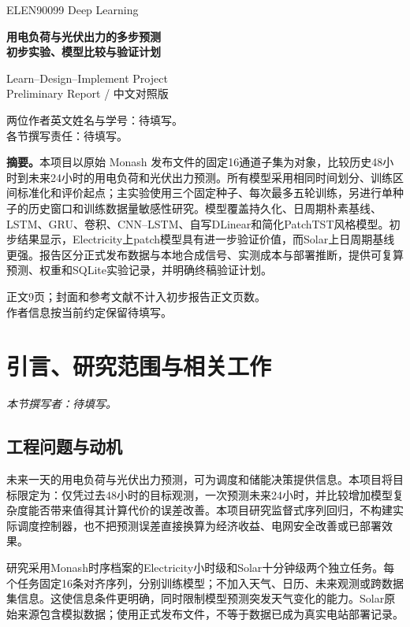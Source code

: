 \documentclass[10pt,a4paper]{article}
\begin{document}
\begin{titlepage}\thispagestyle{empty}\centering\vspace*{22mm}
{\Large ELEN90099 Deep Learning\par}\vspace{8mm}
{\LARGE\bfseries 用电负荷与光伏出力的多步预测\\[4mm]初步实验、模型比较与验证计划\par}\vspace{10mm}
{\large Learn--Design--Implement Project\\Preliminary Report / 中文对照版\par}\vspace{12mm}
两位作者英文姓名与学号：待填写。\\[3mm]各节撰写责任：待填写。
\vspace{12mm}\begin{minipage}{0.88\textwidth}
\textbf{摘要。}本项目以原始 Monash 发布文件的固定16通道子集为对象，比较历史48小时到未来24小时的用电负荷和光伏出力预测。所有模型采用相同时间划分、训练区间标准化和评价起点；主实验使用三个固定种子、每次最多五轮训练，另进行单种子的历史窗口和训练数据量敏感性研究。模型覆盖持久化、日周期朴素基线、LSTM、GRU、卷积、CNN–LSTM、自写DLinear和简化PatchTST风格模型。初步结果显示，Electricity上patch模型具有进一步验证价值，而Solar上日周期基线更强。报告区分正式发布数据与本地合成信号、实测成本与部署推断，提供可复算预测、权重和SQLite实验记录，并明确终稿验证计划。
\end{minipage}\vfill
正文9页；封面和参考文献不计入初步报告正文页数。\\作者信息按当前约定保留待填写。
\end{titlepage}\setcounter{page}{1}
\section{引言、研究范围与相关工作}
\noindent\textit{本节撰写者：待填写。}


\subsection{工程问题与动机}
未来一天的用电负荷与光伏出力预测，可为调度和储能决策提供信息。本项目将目标限定为：仅凭过去48小时的目标观测，一次预测未来24小时，并比较增加模型复杂度能否带来值得其计算代价的误差改善。本项目研究监督式序列回归，不构建实际调度控制器，也不把预测误差直接换算为经济收益、电网安全改善或已部署效果。

研究采用Monash时序档案的Electricity小时级和Solar十分钟级两个独立任务\cite{monash,electricity,solar}。每个任务固定16条对齐序列，分别训练模型；不加入天气、日历、未来观测或跨数据集信息。这使信息条件更明确，同时限制模型预测突发天气变化的能力。Solar原始来源包含模拟数据；使用正式发布文件，不等于数据已成为真实电站部署记录\cite{solar}。
\end{document}
